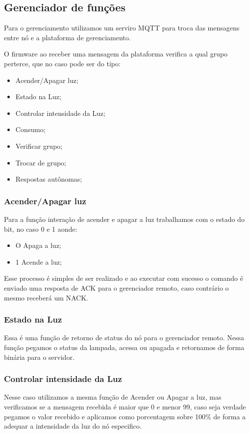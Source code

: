 \documentclass[openright]{normas-utf-tex} %
\begin{document}
\subsection{Gerenciador de funções}

Para o gerenciamento utilizamos um serviro MQTT para troca das mensagens entre nó e a plataforma de gerenciamento. 

O firmware ao receber uma mensagem da plataforma verifica a qual grupo perterce, que no caso pode ser do tipo:

\begin{itemize}
    \item Acender/Apagar luz;
    \item Estado na Luz;
    \item Controlar intensidade da Luz;
    \item Consumo;
    \item Verificar grupo;
    \item Trocar de grupo;
    \item Respostas autônomas;
\end{itemize}

\subsubsection{Acender/Apagar luz}
Para a função interação de acender e apagar a luz trabalhamos com o estado do bit, no caso 0 e 1 aonde:

\begin{itemize}
    \item O Apaga a luz;
    \item 1 Acende a luz;
\end{itemize}

Esse processo é simples de ser realizado e ao executar com sucesso o comando é enviado uma resposta de ACK para o gerenciador remoto, caso contrário o mesmo receberá um NACK.

\subsubsection{Estado na Luz}

Essa é uma função de retorno de status do nó para o gerenciador remoto. Nessa função pegamos o status da lampada, acessa ou apagada e retornamos de forma binária para o servidor.

\subsubsection{Controlar intensidade da Luz}
Nesse caso utilizamos a mesma função de Acender ou Apagar a luz, mas verificamos se a mensagem recebida é maior que 0 e menor 99, caso seja verdade pegamos o valor recebido e aplicamos como porcentagem sobre 100\% de forma a adequar a intensidade da luz do nó especifico.
\end{document}
